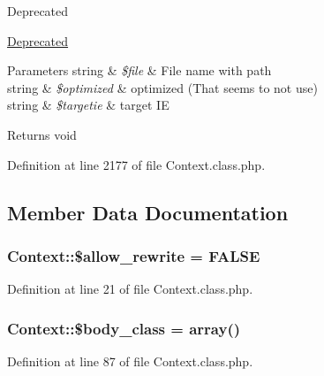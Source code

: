 \begin{DoxyRefDesc}{Deprecated}
\item[\hyperlink{deprecated__deprecated000005}{Deprecated}]
\begin{DoxyParams}[1]{Parameters}
string & {\em \$file} & File name with path \\
\hline
string & {\em \$optimized} & optimized (That seems to not use) \\
\hline
string & {\em \$targetie} & target I\+E \\
\hline
\end{DoxyParams}
\begin{DoxyReturn}{Returns}
void 
\end{DoxyReturn}
\end{DoxyRefDesc}


Definition at line 2177 of file Context.\+class.\+php.



\subsection{Member Data Documentation}
\hypertarget{classContext_a24355a0c151bd3285c45254f773af275}{}
\subsubsection[{\$allow\+\_\+rewrite}]{\setlength{\rightskip}{0pt plus 5cm}Context\+::\$allow\+\_\+rewrite = F\+A\+L\+S\+E}\label{classContext_a24355a0c151bd3285c45254f773af275}


Definition at line 21 of file Context.\+class.\+php.

\hypertarget{classContext_af0bb833a3157d6d2153d7858cb60e435}{}
\subsubsection[{\$body\+\_\+class}]{\setlength{\rightskip}{0pt plus 5cm}Context\+::\$body\+\_\+class = array()}\label{classContext_af0bb833a3157d6d2153d7858cb60e435}


Definition at line 87 of file Context.\+class.\+php.

\hypertarget{classContext_aa2c90f49a1f6389eadea8962d0fbf5b3}{}
